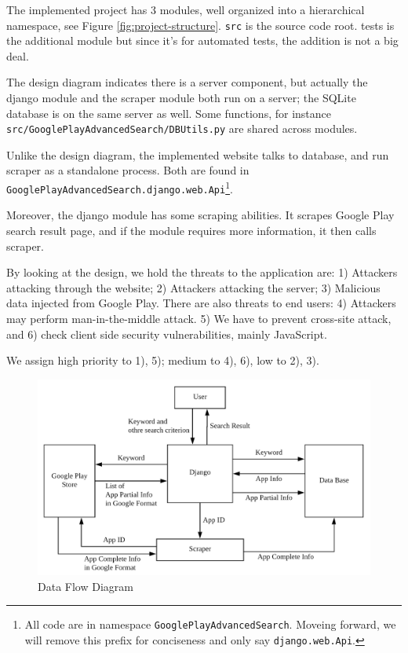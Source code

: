 \documentclass[12pt, a4paper]{article}
\newcommand{\code}[1]{\texttt{#1}}
\begin{document}
The implemented project has 3 modules, well organized into a hierarchical namespace, see Figure \ref{fig:project-structure}. \code{src} is the source code root. tests is the additional module but since it's for automated tests, the addition is not a big deal.

The design diagram indicates there is a server component, but actually the django module and the scraper module both run on a server; the SQLite database is on the same server as well. Some functions, for instance \code{src/GooglePlayAdvancedSearch/DBUtils.py} are shared across modules. 

Unlike the design diagram, the implemented website talks to database, and run scraper as a standalone process. Both are found in \linebreak[4]
\code{GooglePlayAdvancedSearch\linebreak[0].django.web.Api}\footnote{All code are in namespace \code{GooglePlayAdvancedSearch}. Moveing forward, we will remove this prefix for conciseness and only say \code{django.web.Api}.}.

Moreover, the django module has some scraping abilities. It scrapes Google Play search result page, and if the module requires more information, it then calls scraper.

By looking at the design, we hold the threats to the application are: 1) Attackers attacking through the website; 2) Attackers attacking the server; 3) Malicious data injected from Google Play. There are also threats to end users: 4) Attackers may perform man-in-the-middle attack. 5) We have to prevent cross-site attack, and 6) check client side security vulnerabilities, mainly JavaScript.

We assign high priority to 1), 5); medium to 4), 6), low to 2), 3).

\begin{figure}[ht]
\includegraphics[width=\textwidth]{dataFlow.png}
\caption{Data Flow Diagram}
\label{fig:dataFlow}
\end{figure}
\end{document}
